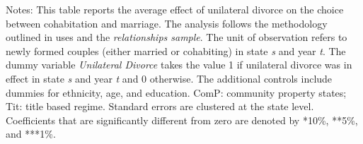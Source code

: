 \begin{table}[H]\centering                                  \scriptsize                                  \caption{The average effect of unilateral divorce on the choice between cohabitation and marriage among newly formed couples, by property regime upon divorce}                    \label{tab:tabrelcom}                                 
\begin{minipage}{\textwidth}
\scriptsize\smallskip
Notes: This table reports the average effect of unilateral divorce on the choice between cohabitation and marriage. The analysis follows the methodology outlined in \cite{borusyak2021} uses and the \textit{relationships sample}. The unit of observation refers to newly formed couples (either married or cohabiting) in state \textit{s} and year \textit{t}. The dummy variable \textit{Unilateral Divorce} takes the value 1 if unilateral divorce was in effect in state \textit{s} and year \textit{t} and 0 otherwise. The additional controls include dummies for ethnicity, age, and education. ComP: community property states; Tit: title based regime. Standard errors are clustered at the state level. Coefficients that are significantly different from zero are denoted by *10\%, **5\%, and ***1\%.
\\
\end{minipage}
\end{table}
